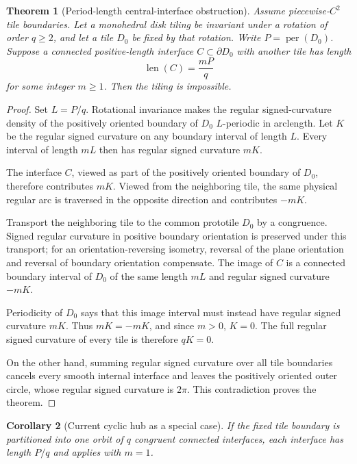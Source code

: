 \documentclass[11pt]{article}
\newtheorem{theorem}{Theorem}[section]
\newtheorem{corollary}[theorem]{Corollary}
\theoremstyle{definition}
\theoremstyle{remark}
\newcommand{\per}{\operatorname{per}}
\begin{document}
\begin{theorem}[Period-length central-interface obstruction]
\label{thm:period-interface}
Assume piecewise-$C^2$ tile boundaries.  Let a monohedral disk tiling be invariant under a rotation of order $q\ge2$, and let a tile $D_0$ be fixed by that rotation.  Write $P=\per(D_0)$.  Suppose a connected positive-length interface $C\subset\partial D_0$ with another tile has length
\[
  \operatorname{len}(C)=\frac{mP}{q}
\]
for some integer $m\ge1$.  Then the tiling is impossible.
\end{theorem}

\begin{proof}
Set $L=P/q$.  Rotational invariance makes the regular signed-curvature density of the positively oriented boundary of $D_0$ $L$-periodic in arclength.  Let $K$ be the regular signed curvature on any boundary interval of length $L$.  Every interval of length $mL$ then has regular signed curvature $mK$.

The interface $C$, viewed as part of the positively oriented boundary of $D_0$, therefore contributes $mK$.  Viewed from the neighboring tile, the same physical regular arc is traversed in the opposite direction and contributes $-mK$.

Transport the neighboring tile to the common prototile $D_0$ by a congruence.  Signed regular curvature in positive boundary orientation is preserved under this transport; for an orientation-reversing isometry, reversal of the plane orientation and reversal of boundary orientation compensate.  The image of $C$ is a connected boundary interval of $D_0$ of the same length $mL$ and regular signed curvature $-mK$.

Periodicity of $D_0$ says that this image interval must instead have regular signed curvature $mK$.  Thus $mK=-mK$, and since $m>0$, $K=0$.  The full regular signed curvature of every tile is therefore $qK=0$.

On the other hand, summing regular signed curvature over all tile boundaries cancels every smooth internal interface and leaves the positively oriented outer circle, whose regular signed curvature is $2\pi$.  This contradiction proves the theorem.
\end{proof}

\begin{corollary}[Current cyclic hub as a special case]
If the fixed tile boundary is partitioned into one orbit of $q$ congruent connected interfaces, each interface has length $P/q$ and  applies with $m=1$.
\end{corollary}
\end{document}
